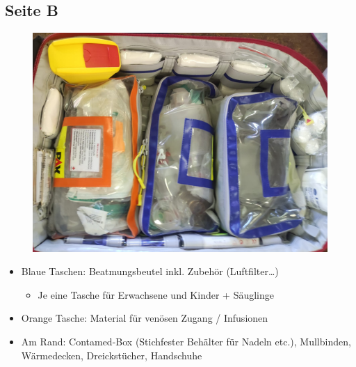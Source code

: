 \subsection*{Seite B}
\begin{figure}[H]
    \centering
    \includegraphics[width=\textwidth]{res/rucksack_b.png}
\end{figure}
\begin{itemize}
    \item Blaue Taschen: Beatmungsbeutel inkl. Zubehör (Luftfilter\dots)
    \begin{itemize}
        \item Je eine Tasche für Erwachsene und Kinder + Säuglinge
    \end{itemize}
    \item Orange Tasche: Material für venösen Zugang / Infusionen
    \item Am Rand: Contamed-Box (Stichfester Behälter für Nadeln etc.), Mullbinden, Wärmedecken, Dreickstücher, Handschuhe
\end{itemize}

